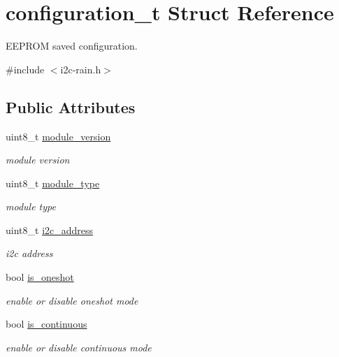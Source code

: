 \hypertarget{structconfiguration__t}{}\section{configuration\+\_\+t Struct Reference}
\label{structconfiguration__t}


E\+E\+P\+R\+OM saved configuration.  




{\ttfamily \#include $<$i2c-\/rain.\+h$>$}

\subsection*{Public Attributes}
\begin{DoxyCompactItemize}
\item 
\mbox{\label{structconfiguration__t_a32d4c4bb78b5b231704c8a9f8d1b9e87}} 
uint8\+\_\+t \hyperlink{structconfiguration__t_a32d4c4bb78b5b231704c8a9f8d1b9e87}{module\+\_\+version}
\begin{DoxyCompactList}\small\item\em module version \end{DoxyCompactList}\item 
\mbox{\label{structconfiguration__t_a7dab895a0a9aa44bb65d90ef8016127d}} 
uint8\+\_\+t \hyperlink{structconfiguration__t_a7dab895a0a9aa44bb65d90ef8016127d}{module\+\_\+type}
\begin{DoxyCompactList}\small\item\em module type \end{DoxyCompactList}\item 
\mbox{\label{structconfiguration__t_a0e088540266e347426ae73aed159f63a}} 
uint8\+\_\+t \hyperlink{structconfiguration__t_a0e088540266e347426ae73aed159f63a}{i2c\+\_\+address}
\begin{DoxyCompactList}\small\item\em i2c address \end{DoxyCompactList}\item 
\mbox{\label{structconfiguration__t_a227ef462f171f25e31cb3b0ce70b2597}} 
bool \hyperlink{structconfiguration__t_a227ef462f171f25e31cb3b0ce70b2597}{is\+\_\+oneshot}
\begin{DoxyCompactList}\small\item\em enable or disable oneshot mode \end{DoxyCompactList}\item 
\mbox{\label{structconfiguration__t_a33f99299576a58b3eb55be371e143531}} 
bool \hyperlink{structconfiguration__t_a33f99299576a58b3eb55be371e143531}{is\+\_\+continuous}
\begin{DoxyCompactList}\small\item\em enable or disable continuous mode \end{DoxyCompactList}\end{DoxyCompactItemize}


